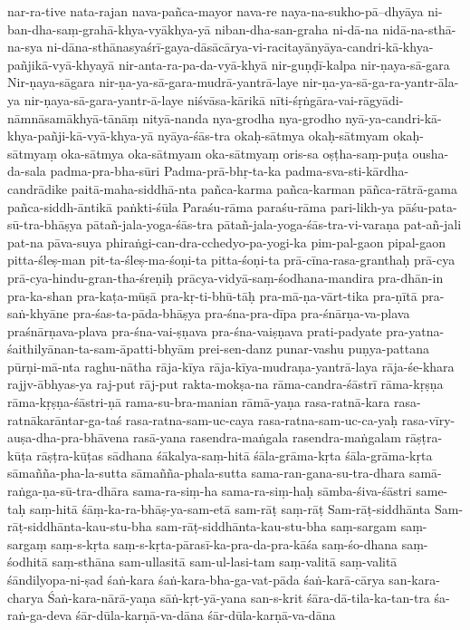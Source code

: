 {nar-ra-tive
nata-rajan
nava-pañca-mayor
nava-re
naya-na-sukho-pā--dhyāya
ni-ban-dha-saṃ-grahā-khya-vyākhya-yā
niban-dha-san-graha
ni-dā-na
nidā-na-sthā-na-sya
ni-dāna-sthānasyaśrī-gaya-dāsācārya-vi-racitayānyāya-candri-kā-khya-pañjikā-vyā-khyayā
nir-anta-ra-pa-da-vyā-khyā
nir-guṇḍī-kalpa
nir-ṇaya-sā-gara
Nir-ṇaya-sāgara
nir-ṇa-ya-sā-gara-mudrā-yantrā-laye
nir-ṇa-ya-sā-ga-ra-yantr-āla-ya
nir-ṇaya-sā-gara-yantr-ā-laye
niśvāsa-kārikā
nīti-śṛṅgāra-vai-rāgyādi-nāmnāsamākhyā-tānāṃ
nityā-nanda
nya-grodha
nya-grodho
nyā-ya-candri-kā-khya-pañji-kā-vyā-khya-yā
nyāya-śās-tra
okaḥ-sātmya
okaḥ-sātmyam
okaḥ-sātmyaṃ
oka-sātmya
oka-sātmyam
oka-sātmyaṃ
oris-sa
oṣṭha-saṃ-puṭa
ousha-da-sala
padma-pra-bha-sūri
Padma-prā-bhṛ-ta-ka
padma-sva-sti-kārdha-candrādike
paitā-maha-siddhā-nta
pañca-karma
pañca-karman
pāñca-rātrā-gama
pañca-siddh-āntikā
paṅkti-śūla
Paraśu-rāma
paraśu-rāma
pari-likh-ya
pāśu-pata-sū-tra-bhāṣya
pātañ-jala-yoga-śās-tra
pātañ-jala-yoga-śās-tra-vi-varaṇa
pat-añ-jali
pat-na
pāva-suya
phiraṅgi-can-dra-cchedyo-pa-yogi-ka
pim-pal-gaon
pipal-gaon
pitta-śleṣ-man
pit-ta-śleṣ-ma-śoṇi-ta
pitta-śoṇi-ta
prā-cīna-rasa-granthaḥ
prā-cya
prā-cya-hindu-gran-tha-śreṇiḥ
prācya-vidyā-saṃ-śodhana-mandira
pra-dhān-in
pra-ka-shan
pra-kaṭa-mūṣā
pra-kṛ-ti-bhū-tāḥ
pra-mā-ṇa-vārt-tika
pra-ṇītā
pra-saṅ-khyāne
pra-śas-ta-pāda-bhāṣya
pra-śna-pra-dīpa
pra-śnārṇa-va-plava
praśnārṇava-plava
pra-śna-vai-ṣṇava
pra-śna-vaiṣṇava
prati-padyate
pra-yatna-śaithilyānan-ta-sam-āpatti-bhyām
prei-sen-danz
punar-vashu
puṇya-pattana
pūrṇi-mā-nta
raghu-nātha
rāja-kīya
rāja-kīya-mudraṇa-yantrā-laya
rāja-śe-khara
rajjv-ābhyas-ya
raj-put
rāj-put
rakta-mokṣa-na
rāma-candra-śāstrī
rāma-kṛṣṇa
rāma-kṛṣṇa-śāstri-ṇā
rama-su-bra-manian
rāmā-yaṇa
rasa-ratnā-kara
rasa-ratnākarāntar-ga-taś
rasa-ratna-sam-uc-caya
rasa-ratna-sam-uc-ca-yaḥ
rasa-vīry-auṣa-dha-pra-bhāvena
rasā-yana
rasendra-maṅgala
rasendra-maṅgalam
rāṣṭra-kūṭa
rāṣṭra-kūṭas
sādhana
śākalya-saṃ-hitā
śāla-grāma-kṛta
śāla-grāma-kṛta
sāmañña-pha-la-sutta
sāmañña-phala-sutta
sama-ran-gana-su-tra-dhara
samā-raṅga-ṇa-sū-tra-dhāra
sama-ra-siṃ-ha
sama-ra-siṃ-haḥ
sāmba-śiva-śāstri
same-taḥ
saṃ-hitā
śāṃ-ka-ra-bhāṣ-ya-sam-etā
sam-rāṭ
saṃ-rāṭ
Sam-rāṭ-siddhānta
Sam-rāṭ-siddhānta-kau-stu-bha
sam-rāṭ-siddhānta-kau-stu-bha
saṃ-sargam
saṃ-sargaṃ
saṃ-s-kṛta
saṃ-s-kṛta-pārasī-ka-pra-da-pra-kāśa
saṃ-śo-dhana
saṃ-śodhitā
saṃ-sthāna
sam-ullasitā
sam-ul-lasi-tam
saṃ-valitā
saṃ-valitā
śāndilyopa-ni-ṣad
śaṅ-kara
śaṅ-kara-bha-ga-vat-pāda
śaṅ-karā-cārya
san-kara-charya
Śaṅ-kara-nārā-yaṇa
sāṅ-kṛt-yā-yana
san-s-krit
śāra-dā-tila-ka-tan-tra
śa-raṅ-ga-deva
śār-dūla-karṇā-va-dāna
śār-dūla-karṇā-va-dāna
}
